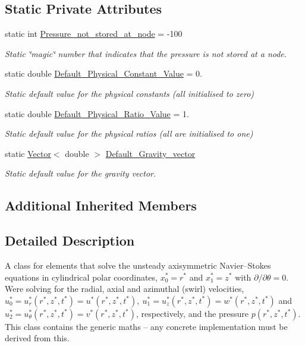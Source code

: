 \subsection*{Static Private Attributes}
\begin{DoxyCompactItemize}
\item 
static int \hyperlink{classoomph_1_1AxisymmetricNavierStokesEquations_a7de6189781f4b7f59de7ae96f669a93b}{Pressure\+\_\+not\+\_\+stored\+\_\+at\+\_\+node} = -\/100
\begin{DoxyCompactList}\small\item\em Static \char`\"{}magic\char`\"{} number that indicates that the pressure is not stored at a node. \end{DoxyCompactList}\item 
static double \hyperlink{classoomph_1_1AxisymmetricNavierStokesEquations_a8ee03721082e7ca463e79083f4029b24}{Default\+\_\+\+Physical\+\_\+\+Constant\+\_\+\+Value} = 0.
\begin{DoxyCompactList}\small\item\em Static default value for the physical constants (all initialised to zero) \end{DoxyCompactList}\item 
static double \hyperlink{classoomph_1_1AxisymmetricNavierStokesEquations_a817781d8e3ef49e200ab675d3b48c541}{Default\+\_\+\+Physical\+\_\+\+Ratio\+\_\+\+Value} = 1.
\begin{DoxyCompactList}\small\item\em Static default value for the physical ratios (all are initialised to one) \end{DoxyCompactList}\item 
static \hyperlink{classoomph_1_1Vector}{Vector}$<$ double $>$ \hyperlink{classoomph_1_1AxisymmetricNavierStokesEquations_a03822b722ac8aa9adceaa52aa4f7dafa}{Default\+\_\+\+Gravity\+\_\+vector}
\begin{DoxyCompactList}\small\item\em Static default value for the gravity vector. \end{DoxyCompactList}\end{DoxyCompactItemize}
\subsection*{Additional Inherited Members}


\subsection{Detailed Description}
A class for elements that solve the unsteady axisymmetric Navier--Stokes equations in cylindrical polar coordinates, $ x_0^* = r^*$ and $ x_1^* = z^* $ with $ \partial / \partial \theta = 0 $. We\textquotesingle{}re solving for the radial, axial and azimuthal (swirl) velocities, $ u_0^* = u_r^*(r^*,z^*,t^*) = u^*(r^*,z^*,t^*), \ u_1^* = u_z^*(r^*,z^*,t^*) = w^*(r^*,z^*,t^*)$ and $ u_2^* = u_\theta^*(r^*,z^*,t^*) = v^*(r^*,z^*,t^*) $, respectively, and the pressure $ p(r^*,z^*,t^*) $. This class contains the generic maths -- any concrete implementation must be derived from this.

